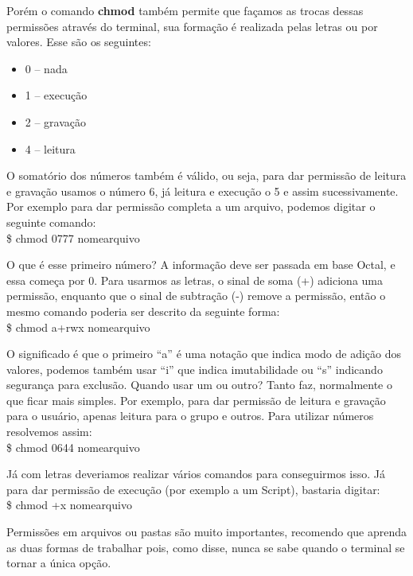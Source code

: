 Porém o comando \textbf{chmod} também permite que façamos as trocas dessas permissões através do terminal, sua formação é realizada pelas letras ou por valores. Esse são os seguintes: \vspace{-1em}
\begin{itemize}[noitemsep]
 \item 0 – nada
 \item 1 – execução
 \item 2 – gravação
 \item 4 – leitura
\end{itemize} 

O somatório dos números também é válido, ou seja, para dar permissão de leitura e gravação usamos o número 6, já leitura e execução o 5 e assim sucessivamente. Por exemplo para dar permissão completa a um arquivo, podemos digitar o seguinte comando: \\
{\ttfamily\$ chmod 0777 nomearquivo}

O que é esse primeiro número? A informação deve ser passada em base Octal, e essa começa por 0. Para usarmos as letras, o sinal de soma (+) adiciona uma permissão, enquanto que o sinal de subtração (-) remove a permissão, então o mesmo comando poderia ser descrito da seguinte forma: \\
{\ttfamily\$ chmod a+rwx nomearquivo}

O significado é que o primeiro ``a'' é uma notação que indica modo de adição dos valores, podemos também usar ``i'' que indica imutabilidade ou ``s'' indicando segurança para exclusão. Quando usar um ou outro? Tanto faz, normalmente o que ficar mais simples. Por exemplo, para dar permissão de leitura e gravação para o usuário, apenas leitura para o grupo e outros. Para utilizar números resolvemos assim: \\
{\ttfamily\$ chmod 0644 nomearquivo}

Já com letras deveriamos realizar vários comandos para conseguirmos isso. Já para dar permissão de execução (por exemplo a um Script), bastaria digitar: \\
{\ttfamily\$ chmod +x nomearquivo}

Permissões em arquivos ou pastas são muito importantes, recomendo que aprenda as duas formas de trabalhar pois, como disse, nunca se sabe quando o terminal se tornar a única opção.

\clearpage